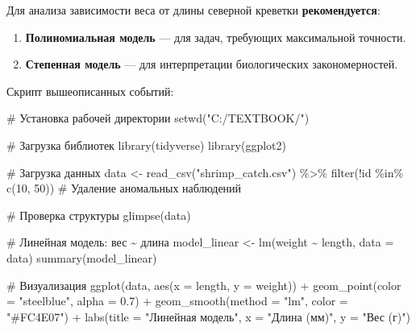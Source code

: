 \documentclass[
  letterpaper,
  DIV=11,
  numbers=noendperiod]{scrreprt}
\newenvironment{Shaded}{\begin{snugshade}}{\end{snugshade}}
\newcommand{\AttributeTok}[1]{\textcolor[rgb]{0.40,0.45,0.13}{#1}}
\newcommand{\CommentTok}[1]{\textcolor[rgb]{0.37,0.37,0.37}{#1}}
\newcommand{\DecValTok}[1]{\textcolor[rgb]{0.68,0.00,0.00}{#1}}
\newcommand{\FloatTok}[1]{\textcolor[rgb]{0.68,0.00,0.00}{#1}}
\newcommand{\FunctionTok}[1]{\textcolor[rgb]{0.28,0.35,0.67}{#1}}
\newcommand{\NormalTok}[1]{\textcolor[rgb]{0.00,0.23,0.31}{#1}}
\newcommand{\OtherTok}[1]{\textcolor[rgb]{0.00,0.23,0.31}{#1}}
\newcommand{\SpecialCharTok}[1]{\textcolor[rgb]{0.37,0.37,0.37}{#1}}
\newcommand{\StringTok}[1]{\textcolor[rgb]{0.13,0.47,0.30}{#1}}
\begin{document}
Для анализа зависимости веса от длины северной креветки
\textbf{рекомендуется}:

\begin{enumerate}
\def\labelenumi{\arabic{enumi}.}
\item
  \textbf{Полиномиальная модель} --- для задач, требующих максимальной
  точности.
\item
  \textbf{Степенная модель} --- для интерпретации биологических
  закономерностей.
\end{enumerate}

Скрипт вышеописанных событий:

\begin{Shaded}
\begin{Highlighting}[]
\CommentTok{\# Установка рабочей директории}
\FunctionTok{setwd}\NormalTok{(}\StringTok{"C:/TEXTBOOK/"}\NormalTok{)}

\CommentTok{\# Загрузка библиотек}
\FunctionTok{library}\NormalTok{(tidyverse)}
\FunctionTok{library}\NormalTok{(ggplot2)}

\CommentTok{\# Загрузка данных}
\NormalTok{data }\OtherTok{\textless{}{-}} \FunctionTok{read\_csv}\NormalTok{(}\StringTok{"shrimp\_catch.csv"}\NormalTok{) }\SpecialCharTok{\%\textgreater{}\%}
  \FunctionTok{filter}\NormalTok{(}\SpecialCharTok{!}\NormalTok{id }\SpecialCharTok{\%in\%} \FunctionTok{c}\NormalTok{(}\DecValTok{10}\NormalTok{, }\DecValTok{50}\NormalTok{))  }\CommentTok{\# Удаление аномальных наблюдений}

\CommentTok{\# Проверка структуры}
\FunctionTok{glimpse}\NormalTok{(data)}

\CommentTok{\# Линейная модель: вес \textasciitilde{} длина}
\NormalTok{model\_linear }\OtherTok{\textless{}{-}} \FunctionTok{lm}\NormalTok{(weight }\SpecialCharTok{\textasciitilde{}}\NormalTok{ length, }\AttributeTok{data =}\NormalTok{ data)}
\FunctionTok{summary}\NormalTok{(model\_linear)}

\CommentTok{\# Визуализация}
\FunctionTok{ggplot}\NormalTok{(data, }\FunctionTok{aes}\NormalTok{(}\AttributeTok{x =}\NormalTok{ length, }\AttributeTok{y =}\NormalTok{ weight)) }\SpecialCharTok{+}
  \FunctionTok{geom\_point}\NormalTok{(}\AttributeTok{color =} \StringTok{"steelblue"}\NormalTok{, }\AttributeTok{alpha =} \FloatTok{0.7}\NormalTok{) }\SpecialCharTok{+}
  \FunctionTok{geom\_smooth}\NormalTok{(}\AttributeTok{method =} \StringTok{"lm"}\NormalTok{, }\AttributeTok{color =} \StringTok{"\#FC4E07"}\NormalTok{) }\SpecialCharTok{+}
  \FunctionTok{labs}\NormalTok{(}\AttributeTok{title =} \StringTok{"Линейная модель"}\NormalTok{, }\AttributeTok{x =} \StringTok{"Длина (мм)"}\NormalTok{, }\AttributeTok{y =} \StringTok{"Вес (г)"}\NormalTok{)}



\end{Highlighting}
\end{Shaded}
\end{document}
